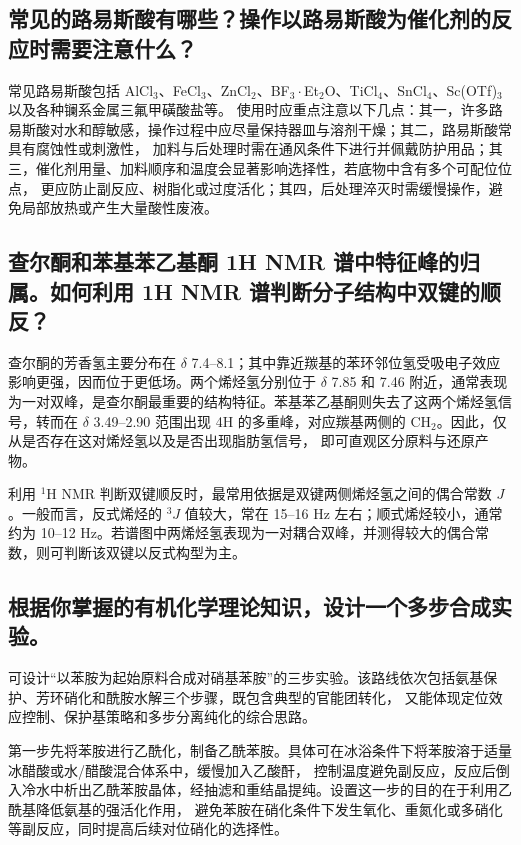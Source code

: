 \documentclass[a4paper]{article}
\begin{document}
\subsection{常见的路易斯酸有哪些？操作以路易斯酸为催化剂的反应时需要注意什么？}

常见路易斯酸包括 AlCl$_3$、FeCl$_3$、ZnCl$_2$、BF$_3\cdot$Et$_2$O、TiCl$_4$、SnCl$_4$、Sc(OTf)$_3$ 以及各种镧系金属三氟甲磺酸盐等。
使用时应重点注意以下几点：其一，许多路易斯酸对水和醇敏感，操作过程中应尽量保持器皿与溶剂干燥；其二，路易斯酸常具有腐蚀性或刺激性，
加料与后处理时需在通风条件下进行并佩戴防护用品；其三，催化剂用量、加料顺序和温度会显著影响选择性，若底物中含有多个可配位位点，
更应防止副反应、树脂化或过度活化；其四，后处理淬灭时需缓慢操作，避免局部放热或产生大量酸性废液。

\subsection{查尔酮和苯基苯乙基酮 1H NMR 谱中特征峰的归属。如何利用 1H NMR 谱判断分子结构中双键的顺反？}

查尔酮的芳香氢主要分布在 $\delta$ 7.4--8.1；其中靠近羰基的苯环邻位氢受吸电子效应影响更强，因而位于更低场。两个烯烃氢分别位于
$\delta$ 7.85 和 7.46 附近，通常表现为一对双峰，是查尔酮最重要的结构特征。苯基苯乙基酮则失去了这两个烯烃氢信号，转而在
$\delta$ 3.49--2.90 范围出现 4H 的多重峰，对应羰基两侧的 CH$_2$。因此，仅从是否存在这对烯烃氢以及是否出现脂肪氢信号，
即可直观区分原料与还原产物。

利用 $^1$H NMR 判断双键顺反时，最常用依据是双键两侧烯烃氢之间的偶合常数 $J$。一般而言，反式烯烃的 $^3J$ 值较大，常在
15--16 Hz 左右；顺式烯烃较小，通常约为 10--12 Hz。若谱图中两烯烃氢表现为一对耦合双峰，并测得较大的偶合常数，则可判断该双键以反式构型为主。

\subsection{根据你掌握的有机化学理论知识，设计一个多步合成实验。}

可设计“以苯胺为起始原料合成对硝基苯胺”的三步实验。该路线依次包括氨基保护、芳环硝化和酰胺水解三个步骤，既包含典型的官能团转化，
又能体现定位效应控制、保护基策略和多步分离纯化的综合思路。

第一步先将苯胺进行乙酰化，制备乙酰苯胺。具体可在冰浴条件下将苯胺溶于适量冰醋酸或水/醋酸混合体系中，缓慢加入乙酸酐，
控制温度避免副反应，反应后倒入冷水中析出乙酰苯胺晶体，经抽滤和重结晶提纯。设置这一步的目的在于利用乙酰基降低氨基的强活化作用，
避免苯胺在硝化条件下发生氧化、重氮化或多硝化等副反应，同时提高后续对位硝化的选择性。
\end{document}
